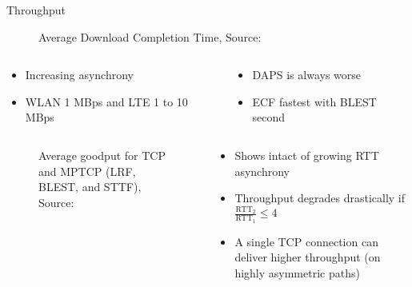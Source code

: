 \documentclass{beamer}
\begin{document}
\begin{frame}[allowframebreaks]{Throughput}
  \vspace{-1.5cm}
  \begin{center}

    \begin{figure}
      \caption{\small Average Download Completion Time, \textcolor{uos-grey-full}{Source: {\cite{ECF}}}}
    \end{figure}

  \end{center}
  \begin{columns}
    \begin{column}{0.5\textwidth}
\begin{itemize}
  \item Increasing asynchrony
  \item WLAN 1 MBps and LTE 1 to 10 MBps
\end{itemize}
    \end{column}
    \begin{column}{0.5\textwidth}
      \begin{itemize}
        \item DAPS is always worse
        \item ECF fastest with BLEST second
      \end{itemize}
    \end{column}
  \end{columns}

  \begin{columns}
    \begin{column}{0.6\textwidth}
      \begin{figure}
        \caption{\small Average goodput for TCP and MPTCP (LRF, BLEST, and STTF), \textcolor{uos-grey-full}{Source: {\cite{lowlatschedulers}}}}
      \end{figure}
    \end{column}
    \begin{column}{0.4\textwidth}
      \vspace{-0.8cm}
      \begin{itemize}
        \item Shows intact of growing RTT asynchrony
        \item Throughput degrades drastically if \(\frac{\text{RTT}_2}{\text{RTT}_1} \leq4\)
        \item A single TCP connection can deliver higher throughput (on highly asymmetric paths)
      \end{itemize}
    \end{column}
  \end{columns}
\end{frame}
\end{document}
